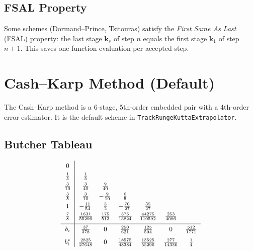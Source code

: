 \documentclass[11pt,a4paper]{article}
\newcommand{\bvec}[1]{\mathbf{#1}}
\begin{document}
\subsection{FSAL Property}

Some schemes (Dormand--Prince, Tsitouras) satisfy the \textit{First Same As Last}
(FSAL) property: the last stage $\bvec{k}_s$ of step $n$ equals the first
stage $\bvec{k}_1$ of step $n+1$. This saves one function evaluation per
accepted step.


\section{Cash--Karp Method (Default)}\label{sec:cashkarp}

The Cash--Karp method is a 6-stage, 5th-order embedded pair with a 4th-order
error estimator. It is the default scheme in \texttt{TrackRungeKuttaExtrapolator}.

\subsection{Butcher Tableau}

\begin{equation}
\renewcommand{\arraystretch}{1.3}
{\small
\begin{array}{c|cccccc}
  0      &         &          &             &              &           \\
  \frac{1}{5}    & \frac{1}{5}     &          &             &              &           \\
  \frac{3}{10}   & \frac{3}{40}    & \frac{9}{40}     &             &              &           \\
  \frac{3}{5}    & \frac{3}{10}    & \!-\frac{9}{10}    & \frac{6}{5}         &              &           \\
  1      & \!-\frac{11}{54}  & \frac{5}{2}      & \!-\frac{70}{27}      & \frac{35}{27}        &           \\
  \frac{7}{8}    & \frac{1631}{55296} & \frac{175}{512} & \frac{575}{13824} & \frac{44275}{110592} & \frac{253}{4096} \\[4pt]
  \hline
  b_i    & \frac{37}{378} & 0 & \frac{250}{621} & \frac{125}{594} & 0 & \frac{512}{1771} \\[4pt]
  b^*_i  & \frac{2825}{27648} & 0 & \frac{18575}{48384} & \frac{13525}{55296} & \frac{277}{14336} & \frac{1}{4}
\end{array}
}
\end{equation}
\end{document}
